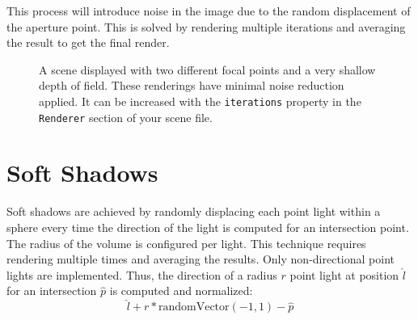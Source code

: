 \documentclass{article}
\begin{document}
\noindent
This process will introduce noise in the image due to the random displacement of the aperture point.
This is solved by rendering multiple iterations and averaging the result to get the final render.

\begin{figure}[H]
    \centering
    \caption{A scene displayed with two different focal points and a very shallow depth of field. These renderings have minimal noise reduction applied. It can be increased with the \texttt{iterations} property in the \texttt{Renderer} section of your scene file.}
\end{figure}

\pagebreak

\section{Soft Shadows}

Soft shadows are achieved by randomly displacing each point light within a sphere every time the direction of the light is computed for an intersection point.
The radius of the volume is configured per light.
This technique requires rendering multiple times and averaging the results.
Only non-directional point lights are implemented.
Thus, the direction of a radius $r$ point light at position $\hat{l}$ for an intersection $\hat{p}$ is computed and normalized:
$$
\hat{l} + r * \text{randomVector}(-1, 1) - \hat{p}
$$
\end{document}
